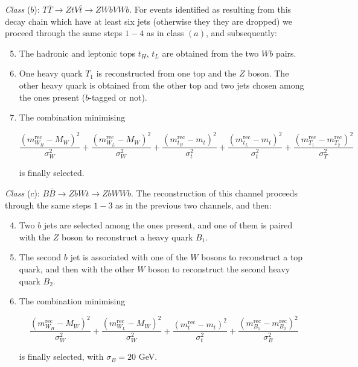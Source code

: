 \documentclass[12pt,a4paper]{article}
\newcommand{\TT}{T \bar T}
\newcommand{\BB}{B \bar B}
\newcommand{\HZ}{V}
\begin{document}
{\em Class} ($b$): $\TT \to Zt \HZ \bar t \to Z Wb \HZ Wb$. For events identified as resulting from this decay chain which have at least six jets (otherwise they they are dropped) we proceed through the same steps $1-4$ as in class $(a)$, and subsequently:
\begin{enumerate}\setcounter{enumi}{4}
\item The hadronic and leptonic tops $t_H$, $t_L$ are obtained from the two $Wb$ pairs.
\item One heavy quark $T_1$ is reconstructed from one top and the $Z$ boson.
The other heavy quark is obtained from the other top and two jets chosen among the ones present ($b$-tagged or not).
\item The combination minimising
\begin{small}
\begin{equation}
\frac{(m_{W_H}^\text{rec}-M_W)^2}{\sigma_W^2} + 
\frac{(m_{W_L}^\text{rec}-M_W)^2}{\sigma_W^2} + 
\frac{(m_{t_H}^\text{rec}-m_t)^2}{\sigma_t^2} +
\frac{(m_{t_L}^\text{rec}-m_t)^2}{\sigma_t^2} +
\frac{(m_{T_1}^\text{rec}-m_{T_2}^\text{rec})^2}{\sigma_T^2}
\end{equation}
\end{small}%
is finally selected.
\end{enumerate}

{\em Class} ($c$): $\BB \to Zb Wt \to Zb WWb$. The reconstruction of this channel proceeds through  
the same steps $1-3$ as in the previous two channels, and then:
\begin{enumerate}\setcounter{enumi}{3}
\item Two $b$ jets are selected among the ones present, and one of them is paired with the $Z$ boson to reconstruct a heavy quark $B_1$.
\item The second $b$ jet is associated with one of the $W$ bosons to reconstruct a top quark, and then with the other $W$ boson to reconstruct the second  heavy quark $B_2$.
\item The combination minimising
\begin{small}
\begin{equation}
\frac{(m_{W_H}^\text{rec}-M_W)^2}{\sigma_W^2} + 
\frac{(m_{W_L}^\text{rec}-M_W)^2}{\sigma_W^2} + 
\frac{(m_{t}^\text{rec}-m_t)^2}{\sigma_t^2} +
\frac{(m_{B_1}^\text{rec}-m_{B_2}^\text{rec})^2}{\sigma_B^2}
\end{equation}
\end{small}%
is finally selected, with $\sigma_B = 20$ GeV.
\end{enumerate}
\end{document}
